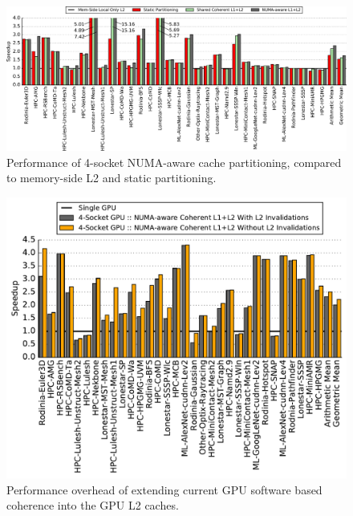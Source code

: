 \begin{figure}[t]
	\centering
	\includegraphics[width=1.0\textwidth]{figures/plot_merged_cache_WB.pdf}
	\caption{Performance of 4-socket NUMA-aware cache partitioning, compared to memory-side L2 and static partitioning.}
	\label{fig:dynamiccaching}
\end{figure}

\begin{figure}[t]
	\centering
	\includegraphics[width=1.0\columnwidth]{figures/plot_no_inval_WB.pdf}
	\caption{Performance overhead of extending current GPU software based coherence into the GPU L2 caches.}
	\vspace{-0.1in}
	\label{fig:invalidations}
\end{figure}

